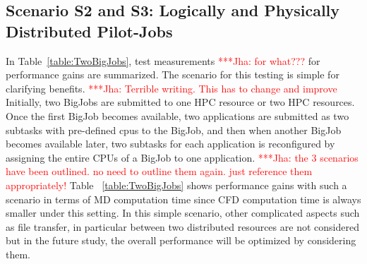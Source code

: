 \documentclass[conference,final]{IEEEtran}
\newcommand{\jhanote}[1]{ {\textcolor{red} { ***Jha: #1 }}}
\newcommand{\jhanote}[1]{}
\begin{document}
\subsection{Scenario S2 and S3: Logically and Physically Distributed
  Pilot-Jobs}


In Table~\ref{table:TwoBigJobs}, test measurements \jhanote{for
  what???}  for performance gains are summarized. The scenario for
this testing is simple for clarifying benefits.  \jhanote{Terrible
  writing. This has to change and improve} Initially, two BigJobs are
submitted to one HPC resource or two HPC resources. Once the first
BigJob becomes available, two applications are submitted as two
subtasks with pre-defined cpus to the BigJob, and then when another
BigJob becomes available later, two subtasks for each application is
reconfigured by assigning the entire CPUs of a BigJob to one
application. \jhanote{the 3 scenarios have been outlined. no need to
  outline them again. just reference them appropriately!} Table
~\ref{table:TwoBigJobs} shows performance gains with such a scenario
in terms of MD computation time since CFD computation time is always smaller under
this setting. In this simple scenario, other complicated aspects such
as file transfer, in particular between two distributed resources are
not considered but in the future study, the overall performance will
be optimized by considering them.

\end{document}
